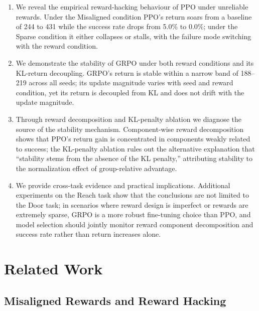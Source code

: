 \begin{enumerate}
  \item We reveal the empirical reward-hacking behaviour of PPO under unreliable rewards. Under the Misaligned condition PPO's return soars from a baseline of 244 to 431 while the success rate drops from 5.0\% to 0.0\%; under the Sparse condition it either collapses or stalls, with the failure mode switching with the reward condition.
  \item We demonstrate the stability of GRPO under both reward conditions and its KL-return decoupling. GRPO's return is stable within a narrow band of 188--219 across all seeds; its update magnitude varies with seed and reward condition, yet its return is decoupled from KL and does not drift with the update magnitude.
  \item Through reward decomposition and KL-penalty ablation we diagnose the source of the stability mechanism. Component-wise reward decomposition shows that PPO's return gain is concentrated in components weakly related to success; the KL-penalty ablation rules out the alternative explanation that ``stability stems from the absence of the KL penalty,'' attributing stability to the normalization effect of group-relative advantage.
  \item We provide cross-task evidence and practical implications. Additional experiments on the Reach task show that the conclusions are not limited to the Door task; in scenarios where reward design is imperfect or rewards are extremely sparse, GRPO is a more robust fine-tuning choice than PPO, and model selection should jointly monitor reward component decomposition and success rate rather than return increases alone.
\end{enumerate}

\section{Related Work}

\subsection{Misaligned Rewards and Reward Hacking}

